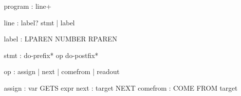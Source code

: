 \begin{CodeBlock}
program : line+

line : label? stmt
     | label

label : LPAREN NUMBER RPAREN

stmt : do-prefix* op do-postfix*

op : assign
   | next
   | comefrom
   | readout

assign : var GETS expr
next : target NEXT
comefrom : COME FROM target
\end{CodeBlock}
